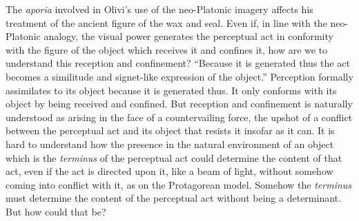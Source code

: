 The \emph{aporia} involved in Olivi's use of the neo-Platonic imagery affects his treatment of the ancient figure of the wax and seal. Even if, in line with the neo-Platonic analogy, the visual power generates the perceptual act in conformity with the figure of the object which receives it and confines it, how are we to understand this reception and confinement? ``Because it is generated thus the act becomes a similitude and signet-like expression of the object.'' Perception formally assimilates to its object because it is generated thus. It only conforms with its object by being received and confined. But reception and confinement is naturally understood as arising in the face of a countervailing force, the upshot of a conflict between the perceptual act and its object that resists it insofar as it can. It is hard to understand how the presence in the natural environment of an object which is the \emph{terminus} of the perceptual act could determine the content of that act, even if the act is directed upon it, like a beam of light, without somehow coming into conflict with it, as on the Protagorean model. Somehow the \emph{terminus} must determine the content of the perceptual act without being a determinant. But how could that be?

